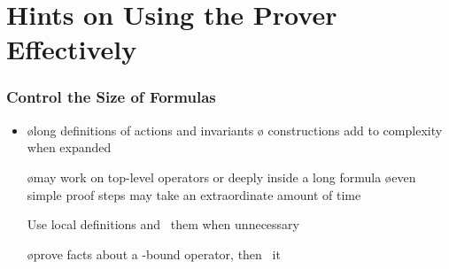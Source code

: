 \section{Hints on Using the Prover Effectively}

\begin{frame}
  \frametitle{Control the Size of Formulas}

  \begin{itemize}
  \item {}

    \begin{itemize}
    \o long definitions of actions and invariants
    \o {} constructions add to complexity when expanded
    \end{itemize}

  \oo {}

    \begin{itemize}
    \o may work on top-level operators or deeply inside a long formula
    \o even simple proof steps may take an extraordinate amount of time
    \end{itemize}

  \oo \alert{Use local definitions and \HIDE\ them when unnecessary}

    \begin{itemize}
    \o prove facts about a -bound operator, then \HIDE\ it
    \end{itemize}
  \end{itemize}

  \vfill\vfill
\end{frame}

